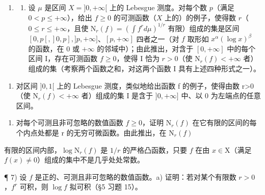 \begin{enumerate}
\def\labelenumi{\arabic{enumi})}
\setcounter{enumi}{4}
\tightlist
\item
  \begin{enumerate}
  \def\labelenumii{\alph{enumii})}
  \tightlist
  \item
    设 \(\mu\) 是区间 \(X = ]0, +\infty[\) 上的 Lebesgue 测度。对每个数 \(p\)（满足 \(0 < p \leqslant +\infty\)），给出 \(f \geqslant 0\) 的可测函数（\(X\) 上的）的例子，使得数 \(r\)（\(0 \leqslant r \leqslant +\infty\)，且使 \(\mathrm{N}_r(f) = (\int f^r d\mu)^{1/r}\) 有限）组成的集是区间 \([0, p[, ]0, p], ]p, +\infty]\)、\([p, +\infty]\) 四者之一（对 \(f\) 取形如 \(x^\alpha(\log x)^\beta\) 的函数，在 \(0\) 或 \(+\infty\) 的邻域中）；由此推出，对含于 \([0, +\infty]\) 中的每个区间 I，存在可测函数 \(f \geqslant 0\)，使得 I 恰为 \(r > 0\)（使 \(\mathrm{N}_r(f) < +\infty\) 者）组成的集（考察两个函数之和，对这两个函数 I 具有上述四种形式之一）。
  \end{enumerate}
\end{enumerate}

\begin{enumerate}
\def\labelenumi{\alph{enumi})}
\setcounter{enumi}{1}
\tightlist
\item
  对区间 \(]0,1[\) 上的 Lebesgue 测度，类似地给出函数 f 的例子，使得由数 r\textgreater0（使 \(\mathrm{N}_{r}(f)<+\infty\) 者）组成的集 I 是含于 \(]0,+\infty]\) 中、以 0 为左端点的任意区间。
\end{enumerate}

\begin{enumerate}
\def\labelenumi{\arabic{enumi})}
\setcounter{enumi}{5}
\tightlist
\item
  对每个可测且非可忽略的数值函数 \(f \geqslant 0\)，证明 \(\mathrm{N}_{r}(f)\) 在它有限的区间的每个内点处都是 r 的无穷可微函数。由此推出，在 \(\mathrm{N}_{r}(f)\)
\end{enumerate}

有限的区间内部，\(\log \mathrm{N}_r(f)\) 是 \(1 / r\) 的严格凸函数，只要 \(f\) 在由 \(x\in \mathrm{X}\)（满足 \(f(x)\neq 0\)）组成的集中不是几乎处处常数。

¶ 7) 设 \(f\) 是正的、可测且非可忽略的数值函数。a) 证明：若对某个有限数 \(r > 0\)，\(f^r\) 可积，则 \(\log f\) 拟可积（§5 习题 15）。

